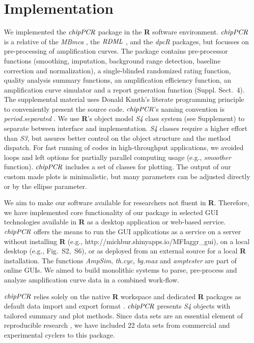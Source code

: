 \documentclass{bioinfo}
\begin{document}
\section{Implementation}
\begin{methods}
We implemented the $\emph{chipPCR}$ package in the \textbf{R} software 
environment. $\emph{chipPCR}$ is a relative of the \emph{MBmca} 
\citep{roediger_RJ_2013}, the $\emph{RDML}$ \citep{blagodatskikh_2014}, and the 
\emph{dpcR} \citep{pabinger_2014} packages, but focusses on pre-processing of 
amplification curves. The package contains pre-processor functions (smoothing, 
imputation, background range detection, baseline correction and normalization), 
a single-blinded randomized rating function, quality analysis summary functions, 
an amplification efficiency function, an amplification curve simulator
and a report generation function (Suppl. Sect.~4). The supplemental material 
uses Donald Knuth's literate programming principle~\citep{Knuth1984} to 
conveniently present the source code. $\emph{chipPCR}$'s naming convention is 
\textit{period.separated} \citep{Baaaath_2012}. We use \textbf{R}'s object model 
\emph{S4} class system (see Supplement) to separate between interface and 
implementation. \emph{S4} classes require a higher effort than \emph{S3}, but 
assures better control on the object structure and the method dispatch. For fast 
running of codes in high-throughput applications, we avoided loops and left 
options for partially parallel computing usage (e.g., \textsl{smoother} 
function). $\emph{chipPCR}$ includes a set of classes for plotting. The output 
of our custom made plots is minimalistic, but many parameters can be adjusted 
directly or by the ellipse parameter.

We aim to make our software available for researchers not fluent in 
\textbf{R}. Therefore, we have implemented core functionality of our package in 
selected GUI technologies available in \textbf{R} \citep{rodiger_rkward_2012} as a
desktop application or web-based service. $\emph{chipPCR}$ offers the means to run 
the GUI applications as a service on a server without installing \textbf{R} (e.g., 
http://michbur.shinyapps.io/MFIaggr\_gui), on a local 
desktop (e.g., Fig.~S2,~S6), or as deployed from an external 
source for a local \textbf{R} installation. The functions \textsl{AmpSim}, 
\textsl{th.cyc}, \textsl{bg.max} and \textsl{amptester} are part of online GUIs. 
We aimed to build monolithic systems to parse, pre-process and analyze 
amplification curve data in a combined work-flow. 

$\emph{chipPCR}$ relies solely on the native \textbf{R} 
workspace and dedicated \textbf{R} packages as default data import 
and export format \citep{perkins_2012,rodiger_rkward_2012,blagodatskikh_2014}. 
$\emph{chipPCR}$ presents \emph{S4} objects with tailored summary and plot 
methods. Since data sets are an essential element of reproducible research 
\citep{Leeper_2014}, we have included 22 data sets from commercial and 
experimental cyclers to this package.
\end{methods}
\end{document}
